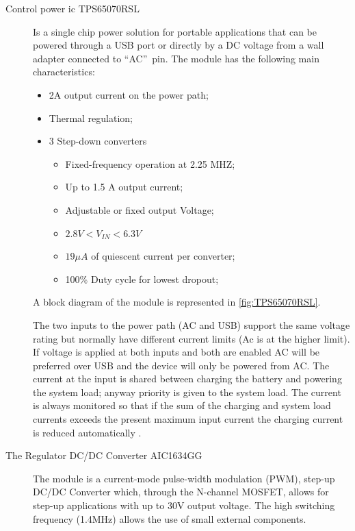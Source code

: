 \documentclass[11pt,a4paper,titlepage]{article}
\begin{document}
				\begin{description}
				  \item [Control power \gls{ic} TPS65070RSL] Is a single chip power solution for portable applications that can be powered through a USB port or directly by a DC voltage from a wall adapter connected to \textquotedblleft AC\textquotedblright\ pin. The module has the following main characteristics:
						\begin{itemize}
							\item 2A output current on the power path;
							\item Thermal regulation;
							\item 3 Step-down converters
								\begin{itemize}
									\item Fixed-frequency operation at 2.25 MHZ;
									\item Up to 1.5 A output current;
									\item Adjustable or fixed output Voltage;
									\item $2.8V < V_{IN} < 6.3V$
									\item $19\mu A$ of quiescent current per converter;
									\item 100\% Duty cycle for lowest dropout;
								\end{itemize}
						\end{itemize}
				  A block diagram of the module is represented in \autoref{fig:TPS65070RSL}.

				  The two inputs to the power path (AC and USB) support the same voltage rating but normally have different current limits (Ac is at the higher limit). If voltage is applied at both inputs and both are enabled AC will be preferred over USB and the device will only be powered from AC. The current at the input is shared between charging the battery and powering the system load; anyway priority is given to the system load. The current is always monitored so that if the sum of the charging and
				  system load currents exceeds the present maximum input current the charging current is reduced automatically \cite{ICpower}.

				  \item[The Regulator DC/DC Converter AIC1634GG] The module is a current-mode pulse-width modulation (PWM), step-up DC/DC Converter which, through the N-channel MOSFET, allows for step-up applications with up to 30V output voltage. The high switching frequency (1.4MHz) allows the use of small external components.


\end{description}
\end{document}
